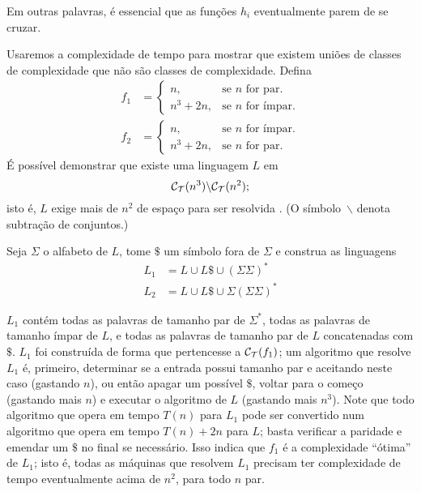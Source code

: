 Em outras palavras,
é essencial que as funções $h_i$
eventualmente parem de se cruzar.

\begin{counterexample}
    Usaremos a complexidade de tempo para mostrar que
    existem uniões de classes de complexidade
    que não são classes de complexidade.
    Defina
    \begin{align*}
        f_1 & = \begin{cases}
                    n, & \text{se $n$ for par.} \\
                    n^3 + 2n, & \text{se $n$ for ímpar.}
                \end{cases} \\
        f_2 & = \begin{cases}
                    n, & \text{se $n$ for ímpar.} \\
                    n^3 + 2n, & \text{se $n$ for par.}
                \end{cases}
    \end{align*}
    É possível demonstrar que existe uma linguagem $L$ em
    \begin{equation*}
        \mathcal C_{\mathcal{T}}(n^3) \backslash \mathcal C_{\mathcal{T}}(n^2);
    \end{equation*}
    isto é, $L$ exige mais de $n^2$ de espaço para ser resolvida
    \cite[p.~299]{HopcroftUllman1979}.
    (O símbolo~$\backslash$ denota subtração de conjuntos.)

    Seja $\Sigma$ o alfabeto de $L$,
    tome $\$$ um símbolo fora de $\Sigma$
    e construa as linguagens
    \begin{align*}
        L_1 &= L \cup L\$ \cup ( \Sigma \Sigma )^* \\
        L_2 &= L \cup L\$ \cup \Sigma ( \Sigma \Sigma )^*
    \end{align*}

    $L_1$ contém todas as palavras de tamanho par de $\Sigma^*$,
    todas as palavras de tamanho ímpar de $L$,
    e todas as palavras de tamanho par de $L$ concatenadas com $\$$.
    $L_1$ foi construída de forma que pertencesse
    a $\mathcal C_{\mathcal{T}}(f_1)$;
    um algoritmo que resolve $L_1$
    é, primeiro, determinar se a entrada possui tamanho par
    e aceitando neste caso
    (gastando $n$),
    ou então apagar um possível $\$$,
    voltar para o começo
    (gastando mais $n$)
    e executar o algoritmo de $L$
    (gastando mais $n^3$).
    Note que todo algoritmo que opera em tempo $T(n)$
    para $L_1$
    pode ser convertido num algoritmo que opera em tempo
    $T(n) + 2n$ para $L$;
    basta verificar a paridade e emendar um $\$$ no final
    se necessário.
    Isso indica que $f_1$ é a complexidade ``ótima''
    de $L_1$;
    isto é,
    todas as máquinas que resolvem $L_1$
    precisam ter complexidade de tempo
    eventualmente acima de $n^2$,
    para todo $n$ par.


\end{counterexample}
